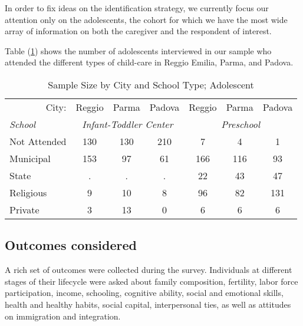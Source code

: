 \documentclass[12pt]{article}
\begin{document}
In order to fix ideas on the identification strategy, we currently focus our attention only on the adolescents, the cohort for which we have the most wide array of information on both the caregiver and the respondent of interest.

Table (\ref{tab:sample-adol}) shows the number of adolescents interviewed in our sample who attended the different types of child-care in Reggio Emilia, Parma, and Padova. 

\begin{table}[htbp]
\begin{center}
\caption{Sample Size by City and School Type; Adolescent }\label{tab:sample-adol}
\begin{tabular}{l| ccc | ccc}
\hline \hline
\multicolumn{1}{r|}{City:} & Reggio & Parma & Padova & Reggio & Parma & Padova \\
\textit{School} & \multicolumn{3}{c|}{\textit{Infant-Toddler Center}}  & \multicolumn{3}{c}{\textit{Preschool}} \\
\hline 
Not Attended & 130 & 130 & 210   &   7 &   4 &   1 \\
Municipal 	 & 153 &  97 &  61   & 166 & 116 &  93 \\
State 		 &  .  &  .  &  .    &  22 &  43 &  47 \\
Religious 	 &   9 &  10 &   8   &  96 &  82 & 131 \\
Private 		 &   3 &  13 &   0   &   6 &   6 &   6 \\
\hline
\end{tabular}
\end{center}
\end{table}


\subsection{Outcomes considered}\label{sec:outcomes}
A rich set of outcomes were collected during the survey. Individuals at different stages of their lifecycle were asked about family composition, fertility, labor force participation, income, schooling, cognitive ability, social and emotional skills, health and healthy habits, social capital, interpersonal ties, as well as attitudes on immigration and integration. 
\end{document}

